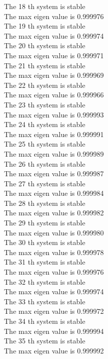 \documentclass[11pt]{article}
\begin{document}
The 18 th system is stable \\
The max eigen value is 0.999976 \\
The 19 th system is stable \\
The max eigen value is 0.999974 \\
The 20 th system is stable \\
The max eigen value is 0.999971 \\
The 21 th system is stable \\
The max eigen value is 0.999969 \\
The 22 th system is stable \\
The max eigen value is 0.999966 \\
The 23 th system is stable \\
The max eigen value is 0.999993 \\
The 24 th system is stable \\
The max eigen value is 0.999991 \\
The 25 th system is stable \\
The max eigen value is 0.999989 \\
The 26 th system is stable \\
The max eigen value is 0.999987 \\
The 27 th system is stable \\
The max eigen value is 0.999984 \\
The 28 th system is stable \\
The max eigen value is 0.999982 \\
The 29 th system is stable \\
The max eigen value is 0.999980 \\
The 30 th system is stable \\
The max eigen value is 0.999978 \\
The 31 th system is stable \\
The max eigen value is 0.999976 \\
The 32 th system is stable \\
The max eigen value is 0.999974 \\
The 33 th system is stable \\
The max eigen value is 0.999972 \\
The 34 th system is stable \\
The max eigen value is 0.999994 \\
The 35 th system is stable \\
The max eigen value is 0.999992 \\
\end{document}

